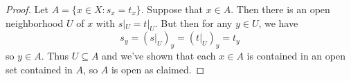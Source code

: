 \begin{proof}
	Let $A = \{ x \in X : s_x = t_x \}$. Suppose that $x \in A$. Then there is an open neighborhood $U$ of $x$ with $s|_U = t|_U$. But then for any $y \in U$, we have
	\[ s_y = (s|_U)_y = (t|_U)_y = t_y \]
	so $y \in A$. Thus $U \subseteq A$ and we've shown that each $x \in A$ is contained in an open set contained in $A$, so $A$ is open as claimed.
\end{proof}
